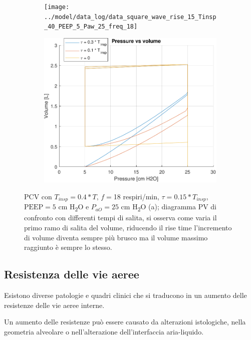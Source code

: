 \begin{figure}[t!]
	\begin{subfigure}{0.5\linewidth}
		\centering
\texttt{[image: ../model/data\_log/data\_square\_wave\_rise\_15\_Tinsp\_40\_PEEP\_5\_Paw\_25\_freq\_18]}
		\caption{}
	\end{subfigure}\hfill
	\begin{subfigure}{0.5\linewidth}
		\centering
\includegraphics[width=0.95\linewidth]{../model/data_log/PV_rise_time.pdf}
		\caption{}
	\end{subfigure}
	\caption{PCV con $T_{insp}=0.4*T$, $f=$18 respiri/min, $\tau=0.15*T_{insp}$, $\mathrm{PEEP}=5$ cm H\textsubscript{2}O e $P_{aO}=25$ cm H\textsubscript{2}O (a); diagramma PV di confronto con differenti tempi di salita, si osserva come varia il primo ramo di salita del volume, riducendo il rise time l'incremento di volume diventa sempre più brusco ma il volume massimo raggiunto è sempre lo stesso.}
	\label{fig:rise_time}
\end{figure}

\subsection{Resistenza delle vie aeree}

Esistono diverse patologie e quadri clinici che si traducono in un aumento delle resistenze delle vie aeree interne. 

Un aumento delle resistenze può essere causato da alterazioni istologiche, nella geometria alveolare o nell'alterazione dell'interfaccia aria-liquido.

